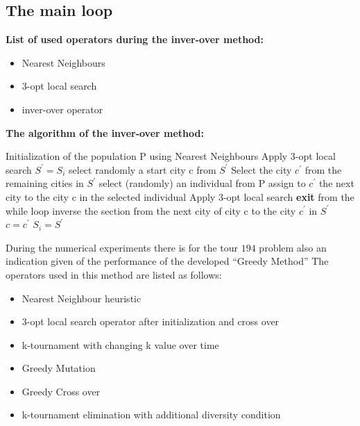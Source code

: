 \documentclass[a4paper,10pt]{article}
\begin{document}
\subsection{The main loop}
%

\textbf{List of used operators during the inver-over method:}
\begin{itemize}
	\item Nearest Neighbours
	\item 3-opt local search
	\item inver-over operator
	
\end{itemize}

\textbf{The algorithm of the inver-over method:}

\begin{algorithmic}
	\STATE Initialization of the population P using Nearest Neighbours
	\STATE Apply 3-opt local search
			\STATE $ S^{'} = S_{i} $
			\STATE select randomly a start city c from $ S^{'} $
				\STATE Select the city $ c^{'} $ from the remaining cities in $ S^{'} $
				\ELSE
				\STATE select (randomly) an individual from P
				\STATE assign to $ c^{'} $ the next city to the city c in the selected individual
				\ENDIF
				\STATE Apply 3-opt local search
				\STATE \textbf{exit} from the while loop
				\ENDIF 
				\STATE inverse the section from the next city of city c to the city $ c^{'} $ in $ S^{'} $ 
				\STATE $c = c^{'}$				
			\ENDWHILE
			\STATE $S_i =  S^{'}$
			\ENDIF
		\ENDFOR
	\ENDWHILE
\end{algorithmic}
\vspace{0.25cm}

During the numerical experiments there is for the tour $ 194 $ problem also an indication given of the performance of the developed ``Greedy Method'' The operators used in this method are listed as follows:

\begin{itemize}
	\item Nearest Neighbour heuristic
	\item 3-opt local search operator after initialization and cross over
	\item k-tournament with changing k value over time
	\item Greedy Mutation
	\item Greedy Cross over
	\item k-tournament elimination with additional diversity condition
\end{itemize} 
\end{document}
